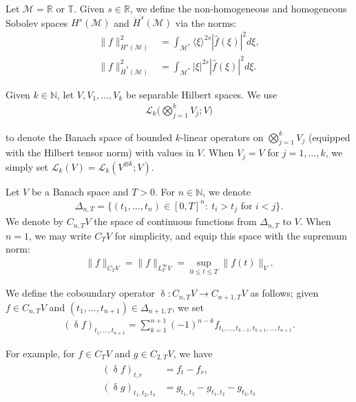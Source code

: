 \documentclass[letterpaper, 11pt,  reqno]{amsart}
\newcommand{\1}{\hspace{0.5mm}\text{I}\hspace{0.5mm}}
\newcommand{\noi}{\noindent}
\newcommand{\R}{\mathbb{R}}
\newcommand{\T}{\mathbb{T}}
\newcommand{\updl}{\updelta}
\newcommand{\Dl}{\Delta}
\newcommand{\ft}{\widehat}
\newcommand{\jb}[1]
{\langle #1 \rangle}
\newcommand{\M}{\mathcal{M}}
\newcommand{\N}{\mathbb{N}}
\newcommand{\cL}{\mathcal{L}}
\numberwithin{equation}{section}
\numberwithin{theorem}{section}
\begin{document}
Let $\M = \R$ or $\T$.
Given $s \in \R$, 
we define the non-homogeneous and homogeneous Sobolev spaces $H^{s}(\M)$ 
and $\dot H^{s}(\M)$ 
via the norms: 
\begin{align*}
\|  f  \|^2_{H^{s}(\M)}
& =
 \int_{\M^*} \jb{\xi}^{2s} |\ft f( \xi)|^2 d\xi, \\
\|  f  \|^2_{\dot H^{s}(\M)}
&  =
 \int_{\M^*} |\xi|^{2s} |\ft f( \xi)|^2 d\xi.
\end{align*}








Given $k \in \N$, 
let $V, V_1, \dots, V_k$  be separable Hilbert spaces.
We use 
\begin{align*}
\cL_k\Big(\bigotimes_{j = 1}^k V_j; V\Big)
\end{align*}

\noi
 to denote 
the Banach space of bounded $k$-linear operators 
on $\bigotimes_{j = 1}^k V_j$ 
(equipped with the Hilbert tensor norm) %
with values in $V$.
When $V_j =  V$ for $j =1, \dots,k$,
we simply set  
 $\cL_k(V)=\cL_k(V^{\otimes k}; V)$. 






Let $V$ be a Banach space and $T>0$.
For $n\in\N$, we denote 
\begin{align*}
\Delta_{n, T} = 
\big\{ (t_1, \ldots, t_n) \in [0,T]^n: \ t_i > t_j 
\text{ for } i < j\big\}.
\end{align*}
We denote by $C_{n,T}V$ 
the space of continuous functions 
from $\Delta_{n,T}$ to $V$. When $n=1$,
we may write $C_T V$ for simplicity, 
and equip this space with the supremum norm: 
\begin{align*}
\|f\|_{C_T V} = \|f\|_{L^\infty_T V} = \sup_{0\leq t \leq T} \|f(t)\|_V.
\end{align*}



\noi
We define the coboundary operator 
$\updl: C_{n,T} V  \to C_{n+1,T} V$ 
as follows; 
given  $f\in C_{n,T} V$ 
and $(t_1,\ldots, t_{n+1}) \in \Dl_{{n+1},T}$, 
we set
\begin{align*}
(\updl f)_{t_1,\ldots , t_{n+1}} = 
\sum_{k=1}^{n+1} (-1)^{n-k} f_{t_1, \ldots, t_{k-1}, t_{k+1}, \ldots, t_{n+1}}.
\end{align*}



\noi
For example, for $f\in C_T V$
and 
$g\in C_{2,T} V$, 
we have 
\begin{align}
\begin{split}
(\updl f )_{t,r} &= f_t - f_r, \\
(\updl g)_{t_1,t_2,t_3} &= 
g_{t_1,t_3} - g_{t_1,t_2} - g_{t_2,t_3}
\end{split}
\label{dl1}
\end{align}
\end{document}
